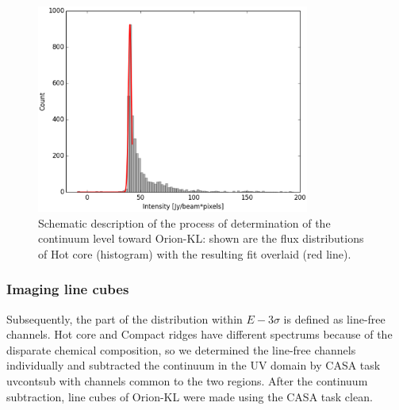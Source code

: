 \begin{figure}[htbp] 
\begin{center}
\includegraphics[width=0.8\textwidth]{OrionKL/ex_histogram_fit.eps}
\caption{Schematic description of the process of determination of the continuum level toward Orion-KL: 
shown are the flux distributions of Hot core (histogram) with the resulting fit overlaid (red line).}
\end{center}
\end{figure}

\newpage

\subsubsection*{Imaging line cubes}
Subsequently, the part of the distribution within $E - 3\sigma$ is defined as line-free channels.
Hot core and Compact ridges have different spectrums because of the disparate chemical composition, 
so we determined the line-free channels individually and subtracted the continuum
in the UV domain by CASA task {\sc uvcontsub} with channels common to the two regions.
After the continuum subtraction, line cubes of Orion-KL were made using the CASA task {\sc clean}.


